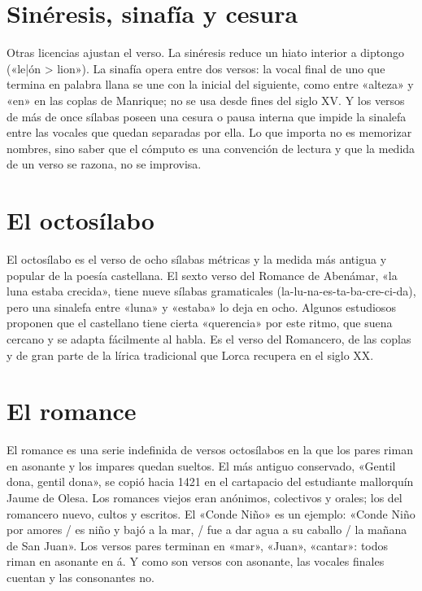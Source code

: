 \documentclass{book}
\begin{document}

\section{Sinéresis, sinafía y cesura}

Otras licencias ajustan el verso. La sinéresis reduce un hiato interior a diptongo («le|ón > lion»). La sinafía opera entre dos versos: la vocal final de uno que termina en palabra llana se une con la inicial del siguiente, como entre «alteza» y «en» en las coplas de Manrique; no se usa desde fines del siglo XV. Y los versos de más de once sílabas poseen una cesura o pausa interna que impide la sinalefa entre las vocales que quedan separadas por ella. Lo que importa no es memorizar nombres, sino saber que el cómputo es una convención de lectura y que la medida de un verso se razona, no se improvisa.


\section{El octosílabo}

El octosílabo es el verso de ocho sílabas métricas y la medida más antigua y popular de la poesía castellana. El sexto verso del Romance de Abenámar, «la luna estaba crecida», tiene nueve sílabas gramaticales (la-lu-na-es-ta-ba-cre-ci-da), pero una sinalefa entre «luna» y «estaba» lo deja en ocho. Algunos estudiosos proponen que el castellano tiene cierta «querencia» por este ritmo, que suena cercano y se adapta fácilmente al habla. Es el verso del Romancero, de las coplas y de gran parte de la lírica tradicional que Lorca recupera en el siglo XX.


\section{El romance}

El romance es una serie indefinida de versos octosílabos en la que los pares riman en asonante y los impares quedan sueltos. El más antiguo conservado, «Gentil dona, gentil dona», se copió hacia 1421 en el cartapacio del estudiante mallorquín Jaume de Olesa. Los romances viejos eran anónimos, colectivos y orales; los del romancero nuevo, cultos y escritos. El «Conde Niño» es un ejemplo: «Conde Niño por amores / es niño y bajó a la mar, / fue a dar agua a su caballo / la mañana de San Juan». Los versos pares terminan en «mar», «Juan», «cantar»: todos riman en asonante en á. Y como son versos con asonante, las vocales finales cuentan y las consonantes no.
\end{document}
